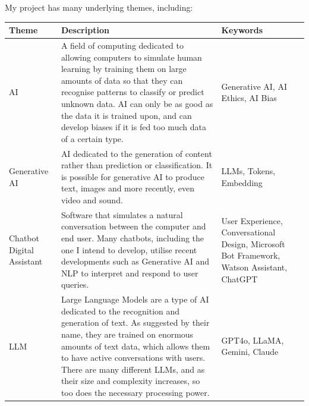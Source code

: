 \documentclass[12pt]{report}
\begin{document}
    My project has many underlying themes, including:

    \begin{table}[H]
        \centering
        \begin{tabular}{|p{}|p{} | p{}|}
            \hline
            \cellcolor{blue!25}Theme & \cellcolor{blue!25}Description &
            \cellcolor{blue!25}Keywords \\

            \hline

            AI & A field of computing dedicated to allowing computers to simulate human
            learning by training them on large amounts of data so that they can recognise patterns to classify or 
            predict unknown data. AI can only be as good as the data it is trained upon, and can 
            develop biases if it is fed too much data of a certain type. & Generative AI, AI Ethics, AI Bias \\

            \hline

            Generative AI & AI dedicated to the generation of content rather than prediction or 
            classification. It is possible for generative AI to produce text, images and 
            more recently, even video and sound. & LLMs, Tokens, Embedding \\

            \hline
            Chatbot \newline Digital Assistant & Software that simulates a natural conversation between the 
            computer and end user. Many chatbots, including the one I intend to develop, utilise recent
            developments such as Generative AI and NLP to interpret and respond to user queries.
            \autocite{IBMChatbotDef}
            & User Experience, Conversational Design, Microsoft Bot Framework, Watson Assistant, ChatGPT \\

            \hline 

            LLM & Large Language Models are a type of AI dedicated to the recognition and generation of text.
            As suggested by their name, they are trained on enormous amounts of text data, which allows them 
            to have active conversations with users. There are many different LLMs, and as their size and 
            complexity increases, so too does the necessary processing power. &
            GPT4o, LLaMA, Gemini, Claude

            \\

            \hline

        \end{tabular}\label{tab:themes}
    \end{table}
\end{document}
